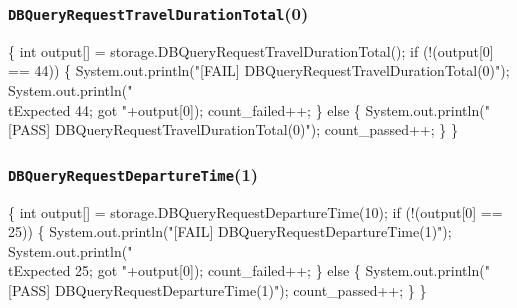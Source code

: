 \documentclass{article}
\def\nwendcode{\endtrivlist \endgroup}
\let\nwdocspar=\par
\begin{document}
\subsubsection{{\tt{}DBQueryRequestTravelDurationTotal}(0)}
\nwenddocs{}\endmoddef{}
\{
  int output[] = storage.DBQueryRequestTravelDurationTotal();
  if (!(output[0] == 44)) \{
    System.out.println("[FAIL] DBQueryRequestTravelDurationTotal(0)");
    System.out.println("\\tExpected 44; got "+output[0]);
    count_failed++;
  \} else \{
    System.out.println("[PASS] DBQueryRequestTravelDurationTotal(0)");
    count_passed++;
  \}
\}
\nwendcode{}\nwdocspar
\subsubsection{{\tt{}DBQueryRequestDepartureTime}(1)}
\nwenddocs{}\endmoddef{}
\{
  int output[] = storage.DBQueryRequestDepartureTime(10);
  if (!(output[0] == 25)) \{
    System.out.println("[FAIL] DBQueryRequestDepartureTime(1)");
    System.out.println("\\tExpected 25; got "+output[0]);
    count_failed++;
  \} else \{
    System.out.println("[PASS] DBQueryRequestDepartureTime(1)");
    count_passed++;
  \}
\}
\nwendcode{}\nwdocspar
\end{document}
